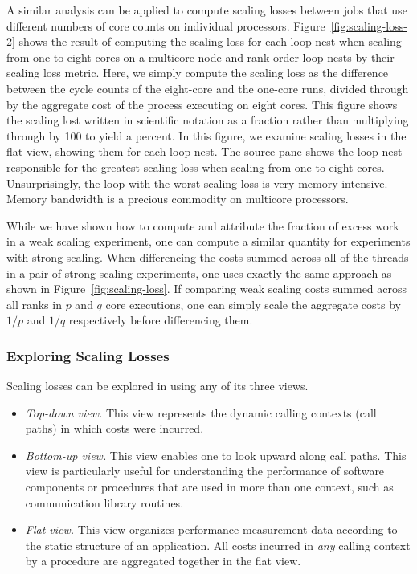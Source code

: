 \documentclass[11pt,twoside,letterpaper]{report}
\begin{document}
A similar analysis can be applied to compute scaling losses between jobs that use different numbers of core counts on individual processors.
 Figure~\ref{fig:scaling-loss-2} shows the result of computing  the scaling loss for each loop nest when scaling from one to eight cores on a multicore node and rank order loop nests by their scaling loss metric. Here, we simply compute the scaling loss as the difference between the cycle counts of the eight-core and the one-core runs, divided through by the aggregate cost of the process executing on eight cores. This figure shows the scaling lost written in scientific notation as a fraction rather than multiplying through by 100 to yield a percent.
In this figure, we examine scaling losses in the flat view, showing them for each loop nest.
The source pane shows the loop nest responsible for the greatest scaling loss when scaling from one to eight cores.
Unsurprisingly, the loop with the worst scaling loss is very memory intensive.
Memory bandwidth is a precious commodity on multicore processors.

While we have shown how to compute and attribute the fraction of excess work in a weak scaling experiment, one can compute a similar quantity for experiments with strong scaling. When differencing the costs summed across all of the threads in a pair of strong-scaling experiments, one uses exactly the same approach as shown in Figure~\ref{fig:scaling-loss}. If comparing weak scaling costs summed across all ranks in $p$ and $q$ core executions, one can simply scale the aggregate costs by $1/p$ and $1/q$ respectively before differencing them.


\subsubsection{Exploring Scaling Losses}

Scaling losses can be explored in \hpcviewer{} using any of its three views.

\begin{itemize}
\item {\em Top-down view.} This view represents the dynamic calling contexts (call paths) in which costs were incurred.

\item {\em Bottom-up view.} This view enables one to look upward along call paths. This view is particularly useful for understanding the performance of software components or procedures that are used in more than one context, such as communication library routines.

\item {\em Flat view.} This view organizes performance measurement data according to the static structure of an application. All costs incurred in {\em any} calling context by a procedure are aggregated together in the flat view.
\end{itemize}
\end{document}
